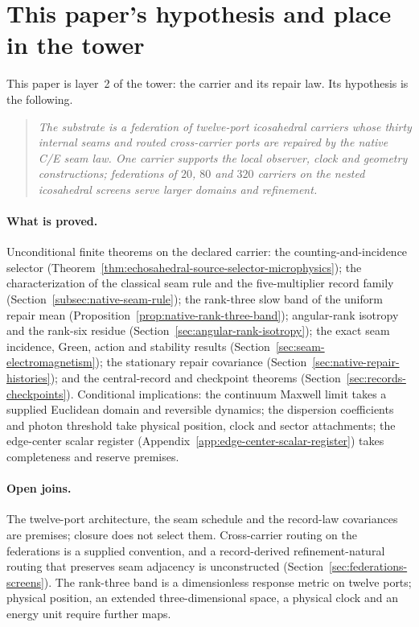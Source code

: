 \documentclass[11pt]{article}
\theoremstyle{remark}
\theoremstyle{plain}
\begin{document}




\section*{This paper's hypothesis and place in the tower}
\label{sec:hypothesis-tower}

This paper is layer~2 of the tower: the carrier and its repair law. Its
hypothesis is the following.

\begin{quote}\itshape
The substrate is a federation of twelve-port icosahedral carriers whose
thirty internal seams and routed cross-carrier ports are repaired by the
native C/E seam law. One carrier supports the local observer, clock and
geometry constructions; federations of \(20\), \(80\) and \(320\) carriers
on the nested icosahedral screens serve larger domains and refinement.
\end{quote}

\paragraph{What is proved.}
Unconditional finite theorems on the declared carrier: the
counting-and-incidence selector
(Theorem~\ref{thm:echosahedral-source-selector-microphysics}); the
characterization of the classical seam rule and the five-multiplier record
family (Section~\ref{subsec:native-seam-rule}); the rank-three slow band of
the uniform repair mean (Proposition~\ref{prop:native-rank-three-band});
angular-rank isotropy and the rank-six residue
(Section~\ref{sec:angular-rank-isotropy}); the exact seam incidence, Green,
action and stability results (Section~\ref{sec:seam-electromagnetism}); the
stationary repair covariance (Section~\ref{sec:native-repair-histories});
and the central-record and checkpoint theorems
(Section~\ref{sec:records-checkpoints}). Conditional implications: the
continuum Maxwell limit takes a supplied Euclidean domain and reversible
dynamics; the dispersion coefficients and photon threshold take physical
position, clock and sector attachments; the edge-center scalar register
(Appendix~\ref{app:edge-center-scalar-register}) takes completeness and
reserve premises.

\paragraph{Open joins.}
The twelve-port architecture, the seam schedule and the record-law
covariances are premises; closure does not select them. Cross-carrier
routing on the federations is a supplied convention, and a record-derived
refinement-natural routing that preserves seam adjacency is unconstructed
(Section~\ref{sec:federations-screens}). The rank-three band is a
dimensionless response metric on twelve ports; physical position, an
extended three-dimensional space, a physical clock and an energy unit
require further maps.
\end{document}
